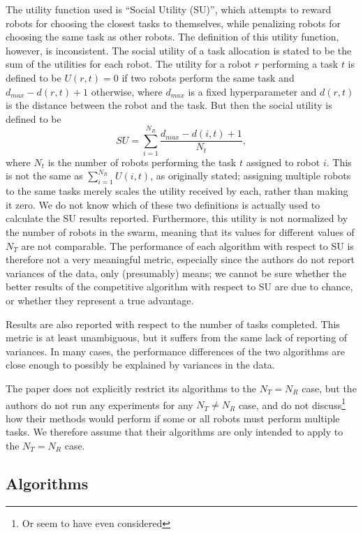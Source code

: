 \documentclass[11pt]{article}
\begin{document}
The utility function used is ``Social Utility (SU)'', which attempts to reward robots for choosing the closest tasks to themselves, while penalizing robots for choosing the same task as other robots. The definition of this utility function, however, is inconsistent. The social utility of a task allocation is stated to be the sum of the utilities for each robot. The utility for a robot $r$ performing a task $t$ is defined to be $U(r,t) = 0$ if two robots perform the same task and $d_{max} - d(r,t) + 1$ otherwise, where $d_{max}$ is a fixed hyperparameter and $d(r,t)$ is the distance between the robot and the task. But then the social utility is defined to be \[SU = \sum_{i=1}^{N_R} \frac{d_{max} - d(i,t) + 1}{N_t},\] where $N_t$ is the number of robots performing the task $t$ assigned to robot $i$. This is not the same as $\sum_{i=1}^{N_R} U(i,t)$, as originally stated; assigning multiple robots to the same tasks merely scales the utility received by each, rather than making it zero. We do not know which of these two definitions is actually used to calculate the SU results reported. Furthermore, this utility is not normalized by the number of robots in the swarm, meaning that its values for different values of $N_T$ are not comparable. The performance of each algorithm with respect to SU is therefore not a very meaningful metric, especially since the authors do not report variances of the data, only (presumably) means; we cannot be sure whether the better results of the competitive algorithm with respect to SU are due to chance, or whether they represent a true advantage.

Results are also reported with respect to the number of tasks completed. This metric is at least unambiguous, but it suffers from the same lack of reporting of variances. In many cases, the performance differences of the two algorithms are close enough to possibly be explained by variances in the data. 

The paper does not explicitly restrict its algorithms to the $N_T=N_R$ case, but the authors do not run any experiments for any $N_T\neq N_R$ case, and do not discuss\footnote{Or seem to have even considered} how their methods would perform if some or all robots must perform multiple tasks. We therefore assume that their algorithms are only intended to apply to the $N_T=N_R$ case.

\subsection*{Algorithms}
\end{document}
